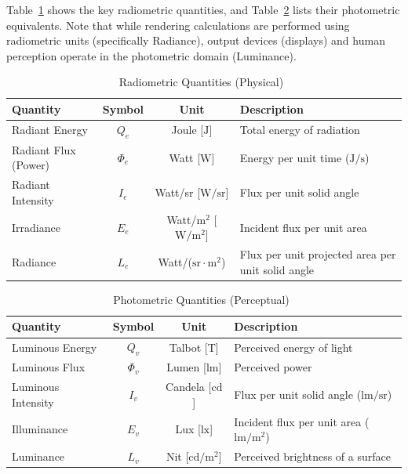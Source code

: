 Table~\ref{tab:radiometric-quantities} shows the key radiometric quantities,
and Table~\ref{tab:photometric-quantities} lists their photometric equivalents.
Note that while rendering calculations are performed using radiometric units (specifically Radiance),
output devices (displays) and human perception operate in the photometric domain (Luminance).

\begin{table}
    \centering
    \caption{Radiometric Quantities (Physical)~\cite{tuwien_rendering_2020}}
    \label{tab:radiometric-quantities}
    \begin{tabular}{lccl}
        \toprule
        \textbf{Quantity} & \textbf{Symbol} & \textbf{Unit} & \textbf{Description} \\
        \midrule
        Radiant Energy & $Q_e$ & Joule [$\mathrm{J}$] & Total energy of radiation \\
        Radiant Flux (Power) & $\Phi_e$ & Watt [$\mathrm{W}$] & Energy per unit time ($\mathrm{J/s}$) \\
        Radiant Intensity & $I_e$ & Watt/sr [$\mathrm{W/sr}$] & Flux per unit solid angle \\
        Irradiance & $E_e$ & Watt/$\mathrm{m}^2$ [$\mathrm{W/m^2}$] & Incident flux per unit area \\
        Radiance & $L_e$ & Watt/($\mathrm{sr} \cdot \mathrm{m}^2$) & Flux per unit projected area per unit solid angle \\
        \bottomrule
    \end{tabular}
\end{table}

\begin{table}
    \centering
    \caption{Photometric Quantities (Perceptual)~\cite{tuwien_rendering_2020}}
    \label{tab:photometric-quantities}
    \begin{tabular}{lccl}
        \toprule
        \textbf{Quantity} & \textbf{Symbol} & \textbf{Unit} & \textbf{Description} \\
        \midrule
        Luminous Energy & $Q_v$ & Talbot [$\mathrm{T}$] & Perceived energy of light \\
        Luminous Flux & $\Phi_v$ & Lumen [$\mathrm{lm}$] & Perceived power \\
        Luminous Intensity & $I_v$ & Candela [$\mathrm{cd}$] & Flux per unit solid angle ($\mathrm{lm/sr}$) \\
        Illuminance & $E_v$ & Lux [$\mathrm{lx}$] & Incident flux per unit area ($\mathrm{lm/m^2}$) \\
        Luminance & $L_v$ & Nit [$\mathrm{cd/m^2}$] & Perceived brightness of a surface \\
        \bottomrule
    \end{tabular}
\end{table}

